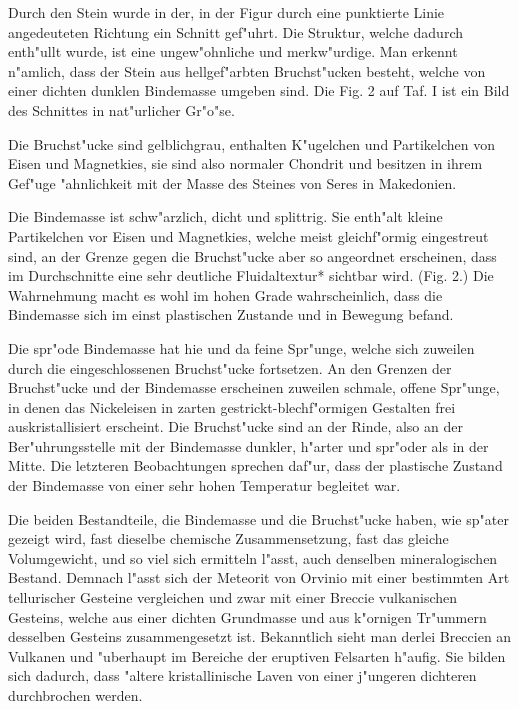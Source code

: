 \documentclass[a4paper, 11pt, oneside]{article}
\begin{document}
Durch den Stein wurde in der, in der Figur durch eine punktierte Linie angedeuteten Richtung ein Schnitt gef"uhrt. Die Struktur, welche dadurch enth"ullt wurde, ist eine ungew"ohnliche und merkw"urdige. Man erkennt n"amlich, dass der Stein aus hellgef"arbten Bruchst"ucken besteht, welche von einer dichten dunklen Bindemasse umgeben sind. Die Fig. 2 auf Taf. I ist ein Bild des Schnittes in nat"urlicher Gr"o"se.

Die Bruchst"ucke sind gelblichgrau, enthalten K"ugelchen und Partikelchen von Eisen und Magnetkies, sie sind also normaler Chondrit und besitzen in ihrem Gef"uge "ahnlichkeit mit der Masse des Steines von Seres in Makedonien.

Die Bindemasse ist schw"arzlich, dicht und splittrig. Sie enth"alt kleine Partikelchen vor Eisen und Magnetkies, welche meist gleichf"ormig eingestreut sind, an der Grenze gegen die Bruchst"ucke aber so angeordnet erscheinen, dass im Durchschnitte eine sehr deutliche Fluidaltextur* sichtbar wird. (Fig. 2.) Die Wahrnehmung macht es wohl im hohen Grade wahrscheinlich, dass die Bindemasse sich im einst plastischen Zustande und in Bewegung befand.

Die spr"ode Bindemasse hat hie und da feine Spr"unge, welche sich zuweilen durch die eingeschlossenen Bruchst"ucke fortsetzen. An den Grenzen der Bruchst"ucke und der Bindemasse erscheinen zuweilen schmale, offene Spr"unge, in denen das Nickeleisen in zarten gestrickt-blechf"ormigen Gestalten frei auskristallisiert erscheint. Die Bruchst"ucke sind an der Rinde, also an der Ber"uhrungsstelle mit der Bindemasse dunkler, h"arter und spr"oder als in der Mitte. Die letzteren Beobachtungen sprechen daf"ur, dass der plastische Zustand der Bindemasse von einer sehr hohen Temperatur begleitet war.

Die beiden Bestandteile, die Bindemasse und die Bruchst"ucke haben, wie sp"ater gezeigt wird, fast dieselbe chemische Zusammensetzung, fast das gleiche Volumgewicht, und so viel sich ermitteln l"asst, auch denselben mineralogischen Bestand. Demnach l"asst sich der Meteorit von Orvinio mit einer bestimmten Art tellurischer Gesteine vergleichen und zwar mit einer Breccie vulkanischen Gesteins, welche aus einer dichten Grundmasse und aus k"ornigen Tr"ummern desselben Gesteins zusammengesetzt ist. Bekanntlich sieht man derlei Breccien an Vulkanen und "uberhaupt im Bereiche der eruptiven Felsarten h"aufig. Sie bilden sich dadurch, dass "altere kristallinische Laven von einer j"ungeren dichteren durchbrochen werden.
\end{document}
